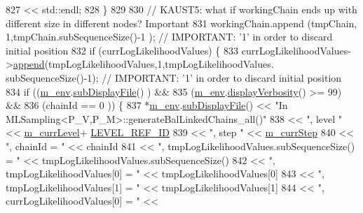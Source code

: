 \begin{DoxyCode}
827                                 << std::endl;
828       \}
829 
830       \textcolor{comment}{// KAUST5: what if workingChain ends up with different size in different nodes? Important}
831       workingChain.append              (tmpChain,              1,tmpChain.subSequenceSize()-1              
      ); \textcolor{comment}{// IMPORTANT: '1' in order to discard initial position}
832       \textcolor{keywordflow}{if} (currLogLikelihoodValues) \{
833         currLogLikelihoodValues->\hyperlink{class_q_u_e_s_o_1_1_scalar_sequence_a75cdd556cc417e35a6b9f7aff86896ae}{append}(tmpLogLikelihoodValues,1,tmpLogLikelihoodValues.
      subSequenceSize()-1); \textcolor{comment}{// IMPORTANT: '1' in order to discard initial position}
834         \textcolor{keywordflow}{if} ((\hyperlink{class_q_u_e_s_o_1_1_m_l_sampling_a13f1ca4fe9f94822fe572a743eaced1d}{m\_env}.\hyperlink{class_q_u_e_s_o_1_1_base_environment_a8a0064746ae8dddfece4229b9ad374d6}{subDisplayFile}()        ) &&
835             (\hyperlink{class_q_u_e_s_o_1_1_m_l_sampling_a13f1ca4fe9f94822fe572a743eaced1d}{m\_env}.\hyperlink{class_q_u_e_s_o_1_1_base_environment_a1fe5f244fc0316a0ab3e37463f108b96}{displayVerbosity}() >= 99) &&
836             (chainId == 0                  )) \{
837           *\hyperlink{class_q_u_e_s_o_1_1_m_l_sampling_a13f1ca4fe9f94822fe572a743eaced1d}{m\_env}.\hyperlink{class_q_u_e_s_o_1_1_base_environment_a8a0064746ae8dddfece4229b9ad374d6}{subDisplayFile}() << \textcolor{stringliteral}{"In
       MLSampling<P\_V,P\_M>::generateBalLinkedChains\_all()"}
838                                   << \textcolor{stringliteral}{", level "}     << \hyperlink{class_q_u_e_s_o_1_1_m_l_sampling_af9416874c856e50f3b35270e801f17e4}{m\_currLevel}+
      \hyperlink{_m_l_sampling_level_options_8h_a68d15eaf394d210effcf584b938206d3}{LEVEL\_REF\_ID}
839                                   << \textcolor{stringliteral}{", step "}      << \hyperlink{class_q_u_e_s_o_1_1_m_l_sampling_a1b1f8ccb4823bdfa26ec652f0807c63e}{m\_currStep}
840                                   << \textcolor{stringliteral}{", chainId = "} << chainId
841                                   << \textcolor{stringliteral}{", tmpLogLikelihoodValues.subSequenceSize() = "} << 
      tmpLogLikelihoodValues.subSequenceSize()
842                                   << \textcolor{stringliteral}{", tmpLogLikelihoodValues[0] = "}                << 
      tmpLogLikelihoodValues[0]
843                                   << \textcolor{stringliteral}{", tmpLogLikelihoodValues[1] = "}                << 
      tmpLogLikelihoodValues[1]
844                                   << \textcolor{stringliteral}{", currLogLikelihoodValues[0] = "}               << 

\end{DoxyCode}
